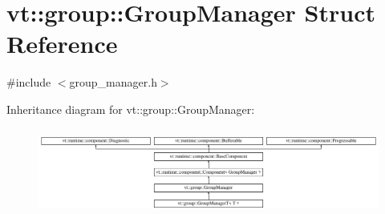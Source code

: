 \hypertarget{structvt_1_1group_1_1_group_manager}{}\section{vt\+:\+:group\+:\+:Group\+Manager Struct Reference}
\label{structvt_1_1group_1_1_group_manager}


{\ttfamily \#include $<$group\+\_\+manager.\+h$>$}

Inheritance diagram for vt\+:\+:group\+:\+:Group\+Manager\+:\begin{figure}[H]
\begin{center}
\leavevmode
\includegraphics[height=2.889577cm]{structvt_1_1group_1_1_group_manager}
\end{center}
\end{figure}
